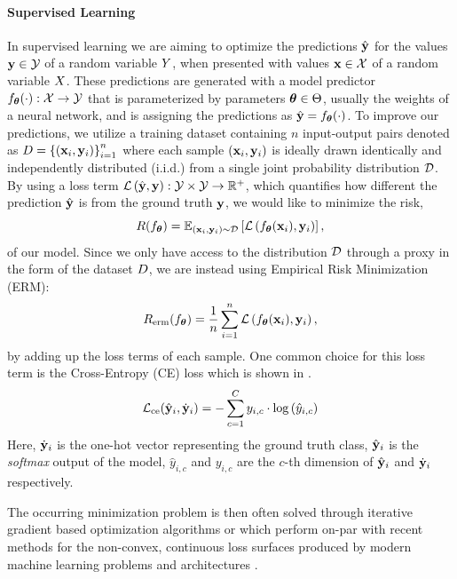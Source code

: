 \paragraph{Supervised Learning}
In supervised learning we are aiming to optimize the predictions $\hat{\mathbf{y}}$ for the values $\mathbf{y} \in \mathcal{Y}$ of a random variable $Y$, when presented with values $\mathbf{x} \in \mathcal{X}$ of a random variable $X$. These predictions are generated with a model predictor $f_{\boldsymbol{\theta}}(\cdot): \mathcal{X} \rightarrow \mathcal{Y}$ that is parameterized by parameters $\boldsymbol{\theta} \in \Theta$, usually the weights of a neural network,  and is assigning the predictions as $\hat{\mathbf{y}}=f_{\boldsymbol{\theta}}(\cdot)$. To improve our predictions, we utilize a training dataset containing $n$ input-output pairs denoted as $D=\left\{\left(\mathbf{x}_i, \mathbf{y}_i \right)\right\}_{i=1}^{n}$ where each sample $(\mathbf{x}_i, \mathbf{y}_i)$ is ideally drawn identically and independently distributed (i.i.d.) from a single joint probability distribution $\mathcal{D}$. By using a loss term $\mathcal{L}\left(\hat{\mathbf{y}}, \mathbf{y}\right): \mathcal{Y} \times \mathcal{Y} \rightarrow \mathbb{R}^{+}$, which quantifies how different the prediction $\hat{\mathbf{y}}$ is from the ground truth $\mathbf{y}$, we would like to minimize the risk,
\begin{equation}
    R(f_{\boldsymbol{\theta}}) = \mathbb{E}_{(\mathbf{x}_i, \mathbf{y}_i) \sim \mathcal{D}}\left[\mathcal{L}\left(f_{\boldsymbol{\theta}}(\mathbf{x}_i), \mathbf{y}_i\right)\right],
\end{equation}
of our model. Since we only have access to the distribution $\mathcal{D}$ through a proxy in the form of the dataset $D$, we are instead using Empirical Risk Minimization (ERM):
\begin{equation}
    R_{\mathrm{erm}}(f_{\boldsymbol{\theta}}) =\frac{1}{n} \sum_{i=1}^n \mathcal{L}\left(f_{\boldsymbol{\theta}}(\mathbf{x}_i), \mathbf{y}_i\right),
\end{equation}
by adding up the loss terms of each sample. One common choice for this loss term is the Cross-Entropy (CE) loss which is shown in .
\begin{equation}
\label{eq:cross_entropy}
    \mathcal{L}_{\mathrm{ce}}(\hat{\mathbf{y}}_i, \dot{\mathbf{y}}_i)=-\sum_{c=1}^{C} y_{i, c} \cdot \log \left(\hat{y}_{i, c}\right)
\end{equation}
Here, $\dot{\mathbf{y}}_i$ is the one-hot vector representing the ground truth class, $\hat{\mathbf{y}}_i$ is the \emph{softmax} output of the model, $\hat{y}_{i, c}$ and $y_{i, c}$ are the $c$-th dimension of $\hat{\mathbf{y}}_i$ and $\dot{\mathbf{y}}_i$ respectively.

The occurring minimization problem is then often solved through iterative gradient based optimization algorithms \eg \sgd{} \citep{Robbins1951} or \adam \citep{Kingma2015} which perform on-par with recent methods for the non-convex, continuous loss surfaces produced by modern machine learning problems and architectures \citep{schmidt2020descending}.

